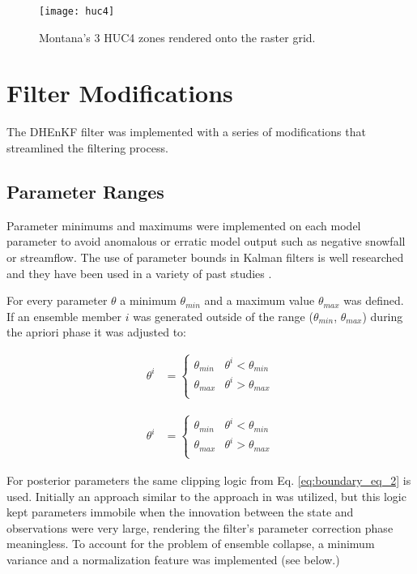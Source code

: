 \begin{figure}[h]
    \centering
    \texttt{[image: huc4]}
    \caption{Montana's 3 HUC4 zones rendered onto the raster grid.}
    \label{fig:huc4}
\end{figure}

\section{Filter Modifications}

The DHEnKF filter was implemented with a series of modifications that streamlined the filtering process.

\subsection{Parameter Ranges}

Parameter minimums and maximums were implemented on each model parameter to avoid anomalous or erratic model output such as negative snowfall or streamflow. The use of parameter bounds in Kalman filters is well researched and they have been used in a variety of past studies \cite{Shi2014}.


For every parameter $\theta$ a minimum $\theta_{min}$ and a maximum value $\theta_{max}$ was defined. If an ensemble member $i$ was generated outside of the range ($\theta_{min}$, $\theta_{max}$) during the apriori phase it was adjusted to:



\begin{align}\label{eq:boundary_eq}
\theta^{i} &= \left\{
\begin{array}{ll}
\theta_{min} & \theta^{i} < \theta_{min} \\
\theta_{max} &  \theta^{i} > \theta_{max} \\
\end{array}
\right.
\end{align}

\begin{align}\label{eq:boundary_eq_2}
\theta^{i} &= \left\{
\begin{array}{ll}
\theta_{min} & \theta^{i} < \theta_{min} \\
\theta_{max} &  \theta^{i} > \theta_{max} \\
\end{array}
\right.
\end{align}

For posterior parameters the same clipping logic from Eq. \eqref{eq:boundary_eq_2} is used. Initially an approach similar to the approach in \cite{Shi2014} was utilized, but this logic kept parameters immobile when the innovation between the state and observations were very large, rendering the filter's parameter correction phase  meaningless. To account for the problem of ensemble collapse, a minimum variance and a normalization feature was implemented (see below.)

